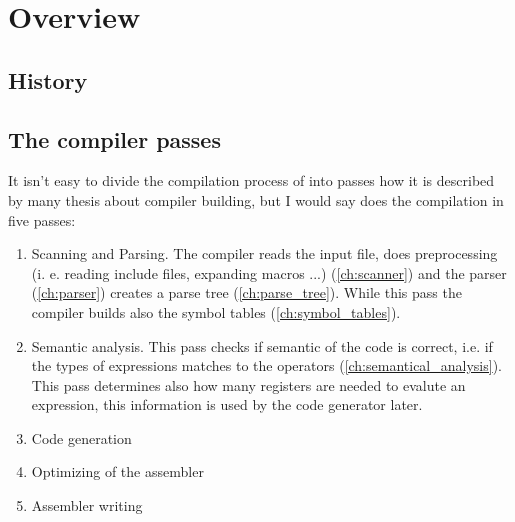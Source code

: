 \documentclass{report}
\begin{document}
\chapter{Overview}

\section{History}

\section{The compiler passes}

It isn't easy to divide the compilation process of \fpc into passes
how it is described by many thesis about compiler building,
but I would say \fpc does the compilation in five passes:

\begin{enumerate}
\item Scanning and Parsing. The compiler reads the input file,
does preprocessing (i. e.
reading include files, expanding macros ...) (\ref{ch:scanner})
and the parser (\ref{ch:parser}) creates a parse tree (\ref{ch:parse_tree}).
While this pass the compiler builds also the symbol tables
(\ref{ch:symbol_tables}).
\item Semantic analysis. This pass checks if semantic of
the code is correct, i.e. if the types of expressions matches
to the operators (\ref{ch:semantical_analysis}). This pass determines
also how many registers are needed to evalute an expression, this
information is used by the code generator later.
\item Code generation
\item Optimizing of the assembler
\item Assembler writing
\end{enumerate}

\label{ch:scanner}
\end{document}
